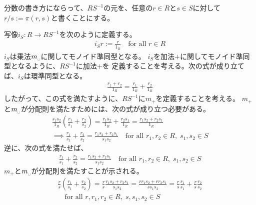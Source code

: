 	分数の書き方にならって、$RS^{-1}$の元を、任意の$r\in R$と$s\in S$に対して
	$r/s:=\pi(r,s)$と書くことにする。

	写像$i_S:R\to RS^{-1}$を次のように定義する。
	\begin{equation*}\begin{split}
		i_Sr := \frac{r}{1_R} \quad\text{for all }r\in R
	\end{split}\end{equation*}
	$i_S$は乗法$m_\myspace$に関してモノイド準同型となる。
	$i_S$を加法$+$に関してモノイド準同型となるように、$RS^{-1}$に加法$+$を
	定義することを考える。次の式が成り立てば、$i_S$は環準同型となる。
	\begin{equation*}\begin{split}
		\frac{r_1 + r_2}{1_R} = \frac{r_1}{1_R} + \frac{r_2}{1_R}
	\end{split}\end{equation*}
	したがって、この式を満たすように、$RS^{-1}$に$m_+$を定義することを考える。
	$m_+$と$m_\myspace$が分配則を満たすためには、次の式が成り立つ必要がある。
	\begin{equation*}\begin{split}
		\frac{s_1s_2}{1_R}\left(\frac{r_1}{s_1} + \frac{r_2}{s_2}\right)
		= \frac{r_1s_2}{1_R} + \frac{r_2s_1}{1_R}
		= \frac{r_1s_2 + r_2s_1}{1_R} \\
		\implies \frac{r_1}{s_1} + \frac{r_2}{s_2} 
		= \frac{r_1s_2 + r_2s_1}{s_1s_2}
		\quad\text{for all }r_1,r_2\in R,\; s_1,s_2\in S
	\end{split}\end{equation*}
	逆に、次の式を満たせば、
	\begin{equation*}\begin{split}
		\frac{r_1}{s_1} + \frac{r_2}{s_2} = \frac{r_1s_2 + r_2s_1}{s_1s_2}
		\quad\text{for all }r_1,r_2\in R,\; s_1,s_2\in S
	\end{split}\end{equation*}
	$m_+$と$m_\myspace$が分配則を満たすことが示される。
	\begin{equation*}\begin{split}
		\frac{r}{s}\left(\frac{r_1}{s_1} + \frac{r_2}{s_2}\right)
		= \frac{r}{s}\frac{r_1s_2 + r_2s_1}{s_1s_2}
		= \frac{rr_1s_2 + rr_2s_1}{ss_1s_2}
		= \frac{r}{s}\frac{r_1}{s_1} + \frac{r}{s}\frac{r_2}{s_2} \\
		\quad\text{for all }r,r_1,r_2\in R,\; s,s_1,s_2\in S
	\end{split}\end{equation*}

